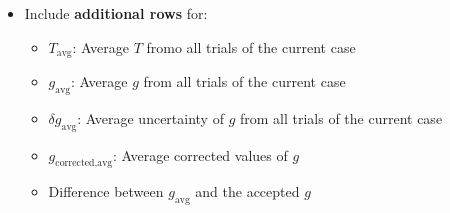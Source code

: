 \begin{enumerate}
\begin{itemize}
\begin{itemize}
  \item Include \textbf{additional rows} for:
  \begin{itemize}
    \item $T_\text{avg}$: Average $T$ fromo all trials of the current case
    \item $g_{\text{avg}}$: Average $g$ from all trials of the current case
    \item $\delta g_{\text{avg}}$: Average uncertainty of $g$ from all trials of the current case
    \item $g_\text{corrected,avg}$: Average corrected values of $g$
    \item Difference between $g_{\text{avg}}$ and the accepted $g$
  \end{itemize}

  
  \end{itemize}
  

    \end{itemize}





\end{enumerate}
